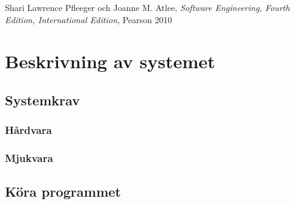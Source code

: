 \documentclass[a4paper,12pt,oneside,final,swedish]{extarticle}
\begin{document}
\begin{thebibliography}{9}

Shari Lawrence Pfleeger och Joanne M. Atlee, \emph{Software Engineering, Fourth Edition, International Edition}, Pearson 2010
  
\end{thebibliography}

\appendix

\section{Beskrivning av systemet}
\subsection{Systemkrav}
\subsubsection{Hårdvara}
\subsubsection{Mjukvara}

\subsection{Köra programmet}
\end{document}
